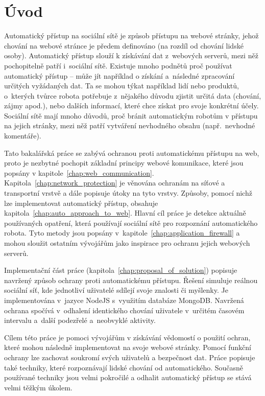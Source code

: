 \chapter{Úvod}

Automatický přístup na sociální sítě je způsob přístupu na webové stránky, jehož chování na webové stránce je předem definováno (na rozdíl od chování lidské osoby). Automatický přístup slouží k získávání dat z~webových serverů, mezi něž pochopitelně patří i~sociální sítě. Existuje mnoho podnětů proč používat automatický přístup -- může jít například o získání a~následné zpracování určitých vyžádaných dat. Ta se mohou týkat například lidí nebo produktů, o~kterých tvůrce robota potřebuje z~nějakého důvodu zjistit určitá data (chování, zájmy apod.), nebo dalších informací, které chce získat pro svoje konkrétní účely. Sociální sítě mají mnoho důvodů, proč bránit automatickým robotům v přístupu na jejich stránky, mezi něž patří vytváření nevhodného obsahu (např.~nevhodné komentáře).

Tato bakalářská práce se zabývá ochranou proti automatickému přístupu na web, proto je nezbytné pochopit základní principy webové komunikace, které jsou popsány v kapitole~\ref{chap:web_communication}. Kapitola~\ref{chap:network_protection} je věnována ochranám na síťové a transportní vrstvě a dále popisuje útoky na tyto vrstvy. Způsoby, pomocí nichž lze implementovat automatický přístup, obsahuje kapitola~\ref{chap:auto_approach_to_web}. Hlavní cíl práce je detekce aktuálně používaných opatření, která používají sociální sítě pro rozpoznání automatického robota. Tyto metody jsou popsány v~kapitole~\ref{chap:application_firewall} a mohou sloužit ostatním vývojářům jako inspirace pro ochranu jejich webových serverů. 

Implementační část práce (kapitola~\ref{chap:proposal_of_solution}) popisuje navržený způsob ochrany proti automatickému přístupu. Řešení simuluje reálnou sociální síť, kde jednotliví uživatelé sdílejí svoje znalosti či myšlenky. Je implementována v~jazyce NodeJS s~využitím databáze MongoDB. Navržená ochrana spočívá v~odhalení identického chování uživatele v~určitém časovém intervalu a~další podezřelé a~neobvyklé aktivity. 

Cílem této práce je pomoci vývojářům v získávání vědomostí o použití ochran, které mohou následně implementovat na svoje webové stránky. Pomocí funkční ochrany lze zachovat soukromí svých uživatelů a bezpečnost dat. Práce popisuje také techniky, které rozpoznávají lidské chování od automatického. Současně používané techniky jsou velmi pokročilé a odhalit automatický přístup se stává velmi těžkým úkolem.

